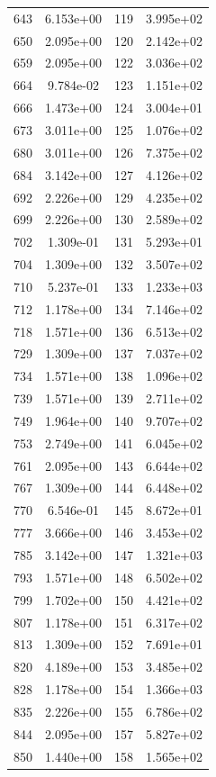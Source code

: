 \documentclass[12pt]{article}
\begin{document}
\begin{longtable}{@{}cccc@{}}
643 & 6.153e+00 & 119 & 3.995e+02 \\
650 & 2.095e+00 & 120 & 2.142e+02 \\
659 & 2.095e+00 & 122 & 3.036e+02 \\
664 & 9.784e-02 & 123 & 1.151e+02 \\
666 & 1.473e+00 & 124 & 3.004e+01 \\
673 & 3.011e+00 & 125 & 1.076e+02 \\
680 & 3.011e+00 & 126 & 7.375e+02 \\
684 & 3.142e+00 & 127 & 4.126e+02 \\
692 & 2.226e+00 & 129 & 4.235e+02 \\
699 & 2.226e+00 & 130 & 2.589e+02 \\
702 & 1.309e-01 & 131 & 5.293e+01 \\
704 & 1.309e+00 & 132 & 3.507e+02 \\
710 & 5.237e-01 & 133 & 1.233e+03 \\
712 & 1.178e+00 & 134 & 7.146e+02 \\
718 & 1.571e+00 & 136 & 6.513e+02 \\
729 & 1.309e+00 & 137 & 7.037e+02 \\
734 & 1.571e+00 & 138 & 1.096e+02 \\
739 & 1.571e+00 & 139 & 2.711e+02 \\
749 & 1.964e+00 & 140 & 9.707e+02 \\
753 & 2.749e+00 & 141 & 6.045e+02 \\
761 & 2.095e+00 & 143 & 6.644e+02 \\
767 & 1.309e+00 & 144 & 6.448e+02 \\
770 & 6.546e-01 & 145 & 8.672e+01 \\
777 & 3.666e+00 & 146 & 3.453e+02 \\
785 & 3.142e+00 & 147 & 1.321e+03 \\
793 & 1.571e+00 & 148 & 6.502e+02 \\
799 & 1.702e+00 & 150 & 4.421e+02 \\
807 & 1.178e+00 & 151 & 6.317e+02 \\
813 & 1.309e+00 & 152 & 7.691e+01 \\
820 & 4.189e+00 & 153 & 3.485e+02 \\
828 & 1.178e+00 & 154 & 1.366e+03 \\
835 & 2.226e+00 & 155 & 6.786e+02 \\
844 & 2.095e+00 & 157 & 5.827e+02 \\
850 & 1.440e+00 & 158 & 1.565e+02 \\

\end{longtable}
\end{document}
